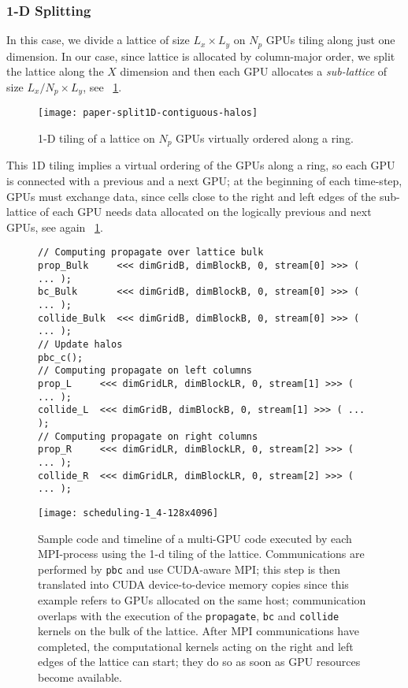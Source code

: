 \documentclass{elsarticle}
\begin{document}
\subsubsection*{1-D Splitting}

In this case, we divide a lattice of size $L_x \times L_y$ 
on $N_p$ GPUs tiling along just one dimension. In our case, since lattice is allocated 
by column-major order, we split the lattice along the $X$ dimension and 
then each GPU allocates a {\em sub-lattice} of size $ L_x / N_p \times L_y$, 
see \figurename~\ref{1D-tiling}.
%
%
\begin{figure}
\centering
\texttt{[image: paper-split1D-contiguous-halos]}
\caption{\label{1D-tiling} 1-D tiling of a lattice on $N_p$ GPUs virtually 
ordered along a ring.}
\end{figure}
%
%
This 1D tiling implies a virtual ordering of the GPUs along a ring, so each GPU 
is connected with a previous and a next GPU; at the beginning of each time-step, 
GPUs must exchange data, since cells close to the right and left edges 
of the sub-lattice of each GPU needs data allocated on the logically previous 
and next GPUs, see again \figurename~\ref{1D-tiling}.

%
\begin{figure}
\centering
\begin{lstlisting}[basicstyle=\scriptsize]
// Computing propagate over lattice bulk
prop_Bulk     <<< dimGridB, dimBlockB, 0, stream[0] >>> ( ... );
bc_Bulk       <<< dimGridB, dimBlockB, 0, stream[0] >>> ( ... );
collide_Bulk  <<< dimGridB, dimBlockB, 0, stream[0] >>> ( ... );
// Update halos
pbc_c();
// Computing propagate on left columns
prop_L     <<< dimGridLR, dimBlockLR, 0, stream[1] >>> ( ... );
collide_L  <<< dimGridB, dimBlockB, 0, stream[1] >>> ( ... );
// Computing propagate on right columns
prop_R     <<< dimGridLR, dimBlockLR, 0, stream[2] >>> ( ... );
collide_R  <<< dimGridLR, dimBlockLR, 0, stream[2] >>> ( ... );
\end{lstlisting}
%
\vspace*{2.5mm}
%
\texttt{[image: scheduling-1\_4-128x4096]}
%
\caption{Sample code and timeline of a multi-GPU code executed by 
each MPI-process using the 1-d tiling of the lattice. 
Communications are performed by {\tt pbc} and use CUDA-aware 
MPI; this step is then translated into CUDA device-to-device memory copies 
since this example refers to GPUs allocated on the same host; 
communication overlaps with the execution of the {\tt propagate}, 
{\tt bc} and {\tt collide} kernels on the bulk of the lattice. 
After MPI communications have  
completed, the computational kernels acting on the right and left 
edges of the lattice can start; they do so as soon as GPU resources 
become available.}
\label{flowchart}
\end{figure}
\end{document}
